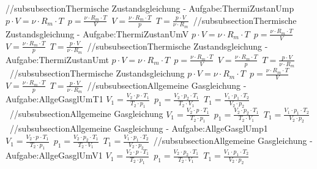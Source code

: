 //subsubsection{Thermische Zustandsgleichung - Aufgabe:ThermiZustanUmp} 
$ p\cdot V =\nu \cdot R_{m} \cdot T $\ 
$ p =\frac{\nu \cdot R_{m} \cdot T}{  V} $\ 
$ V =\frac{\nu \cdot R_{m} \cdot T}{  p} $\ 
$ T =\frac{p\cdot V}{\nu \cdot R_{m} } $\ 
//subsubsection{Thermische Zustandsgleichung - Aufgabe:ThermiZustanUmV} 
$ p\cdot V =\nu \cdot R_{m} \cdot T $\ 
$ p =\frac{\nu \cdot R_{m} \cdot T}{  V} $\ 
$ V =\frac{\nu \cdot R_{m} \cdot T}{  p} $\ 
$ T =\frac{p\cdot V}{\nu \cdot R_{m} } $\ 
//subsubsection{Thermische Zustandsgleichung - Aufgabe:ThermiZustanUmt} 
$ p\cdot V =\nu \cdot R_{m} \cdot T $\ 
$ p =\frac{\nu \cdot R_{m} \cdot T}{  V} $\ 
$ V =\frac{\nu \cdot R_{m} \cdot T}{  p} $\ 
$ T =\frac{p\cdot V}{\nu \cdot R_{m} } $\ 
//subsubsection{Thermische Zustandsgleichung} 
$ p\cdot V =\nu \cdot R_{m} \cdot T $\ 
$ p =\frac{\nu \cdot R_{m} \cdot T}{  V} $\ 
$ V =\frac{\nu \cdot R_{m} \cdot T}{  p} $\ 
$ T =\frac{p\cdot V}{\nu \cdot R_{m} } $\ 
//subsubsection{Allgemeine Gasgleichung - Aufgabe:AllgeGasglUmT1} 
$ V_{1}  = \frac{V_{2} \cdot p_{} \cdot T_{1} }{  T_{2} \cdot p_{1} } $\ 
$ p_{1}  = \frac{V_{2} \cdot p_{2} \cdot T_{1} }{  T_{2} \cdot V_{1} } $\ 
$ T_{1}  = \frac{V_{1} \cdot p_{1} \cdot T_{2} }{  V_{2} \cdot p_{2} } $\ 
//subsubsection{Allgemeine Gasgleichung} 
$ V_{1}  = \frac{V_{2} \cdot p_{} \cdot T_{1} }{  T_{2} \cdot p_{1} } $\ 
$ p_{1}  = \frac{V_{2} \cdot p_{2} \cdot T_{1} }{  T_{2} \cdot V_{1} } $\ 
$ T_{1}  = \frac{V_{1} \cdot p_{1} \cdot T_{2} }{  V_{2} \cdot p_{2} } $\ 
//subsubsection{Allgemeine Gasgleichung - Aufgabe:AllgeGasglUmp1} 
$ V_{1}  = \frac{V_{2} \cdot p_{} \cdot T_{1} }{  T_{2} \cdot p_{1} } $\ 
$ p_{1}  = \frac{V_{2} \cdot p_{2} \cdot T_{1} }{  T_{2} \cdot V_{1} } $\ 
$ T_{1}  = \frac{V_{1} \cdot p_{1} \cdot T_{2} }{  V_{2} \cdot p_{2} } $\ 
//subsubsection{Allgemeine Gasgleichung - Aufgabe:AllgeGasglUmV1} 
$ V_{1}  = \frac{V_{2} \cdot p_{} \cdot T_{1} }{  T_{2} \cdot p_{1} } $\ 
$ p_{1}  = \frac{V_{2} \cdot p_{2} \cdot T_{1} }{  T_{2} \cdot V_{1} } $\ 
$ T_{1}  = \frac{V_{1} \cdot p_{1} \cdot T_{2} }{  V_{2} \cdot p_{2} } $\ 
